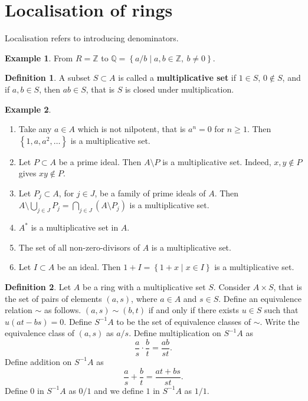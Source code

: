 \documentclass{article}
\newcommand{\Z}{\mathbb{Z}}
\newcommand{\Q}{\mathbb{Q}}
\newcommand{\rb}[1]{\left( #1 \right)}
\newcommand{\cb}[1]{\left\{ #1 \right\}}
\theoremstyle{definition}\newtheorem{definition}{Definition}[section]
\theoremstyle{definition}\newtheorem{remark}[definition]{Remark}
\theoremstyle{definition}\newtheorem*{example}{Example}
\theoremstyle{definition}\newtheorem*{note}{Note}
\begin{document}
\section{Localisation of rings}

Localisation refers to introducing denominators.

\begin{example}
From $ R = \Z $ to $ \Q = \cb{a / b \mid a, b \in \Z, \ b \ne 0} $.
\end{example}

\begin{definition}
A subset $ S \subset A $ is called a \textbf{multiplicative set} if $ 1 \in S $, $ 0 \not\in S $, and if $ a, b \in S $, then $ ab \in S $, that is $ S $ is closed under multiplication.
\end{definition}

\begin{example}
\hfill
\begin{enumerate}
\item Take any $ a \in A $ which is not nilpotent, that is $ a^n = 0 $ for $ n \ge 1 $. Then $ \cb{1, a, a^2, \dots} $ is a multiplicative set.
\item Let $ P \subset A $ be a prime ideal. Then $ A \setminus P $ is a multiplicative set. Indeed, $ x, y \notin P $ gives $ xy \notin P $.
\item Let $ P_j \subset A $, for $ j \in J $, be a family of prime ideals of $ A $. Then $ A \setminus \bigcup_{j \in J} P_j = \bigcap_{j \in J} \rb{A \setminus P_j} $ is a multiplicative set.
\item $ A^* $ is a multiplicative set in $ A $.
\item The set of all non-zero-divisors of $ A $ is a multiplicative set.
\item Let $ I \subset A $ be an ideal. Then $ 1 + I = \cb{1 + x \mid x \in I} $ is a multiplicative set.
\end{enumerate}
\end{example}

\begin{definition}
Let $ A $ be a ring with a multiplicative set $ S $. Consider $ A \times S $, that is the set of pairs of elements $ \rb{a, s} $, where $ a \in A $ and $ s \in S $. Define an equivalence relation $ \sim $ as follows. $ \rb{a, s} \sim \rb{b, t} $ if and only if there exists $ u \in S $ such that $ u\rb{at - bs} = 0 $. Define $ S^{-1}A $ to be the set of equivalence classes of $ \sim $. Write the equivalence class of $ \rb{a, s} $ as $ a / s $. Define multiplication on $ S^{-1}A $ as
$$ \dfrac{a}{s} \cdot \dfrac{b}{t} = \dfrac{ab}{st}. $$
Define addition on $ S^{-1}A $ as
$$ \dfrac{a}{s} + \dfrac{b}{t} = \dfrac{at + bs}{st}. $$
Define $ 0 $ in $ S^{-1}A $ as $ 0 / 1 $ and we define $ 1 $ in $ S^{-1}A $ as $ 1 / 1 $.
\end{definition}
\end{document}
